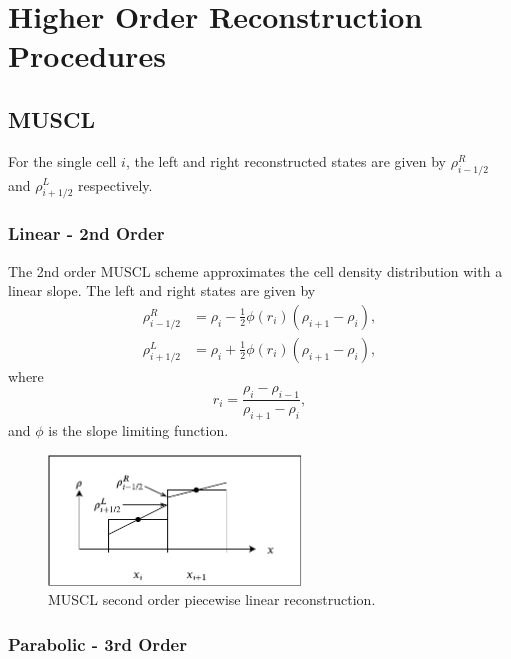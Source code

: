 \chapter{Higher Order Reconstruction Procedures}
\label{ap:reco}
\graphicspath{{image_directory/appendix/}}

\section{MUSCL}
\label{ap:MUSCLreco}

	For the single cell $i$, the left and right reconstructed states are given by $\rho^{R}_{i-1/2}$ and $\rho_{i+1/2}^{L}$ respectively. 

\subsection{Linear - 2nd Order}
	
	The 2nd order MUSCL scheme approximates the cell density distribution with a linear slope. The left and right states are given by
	\begin{align}
		\rho^{R}_{i-1/2}&=\rho_i-\frac{1}{2}\phi\left(r_i\right)\left(\rho_{i+1}-\rho_{i}\right),\\
		\rho^{L}_{i+1/2}&=\rho_i+\frac{1}{2}\phi\left(r_i\right)\left(\rho_{i+1}-\rho_{i}\right),
	\end{align}
	where 
	\begin{equation}
		r_{i}=\frac{\rho_{i}-\rho_{i-1}}{\rho_{i+1}-\rho_{i}},
	\end{equation}
	and $\phi$ is the slope limiting function.
	
	\begin{figure}
    		\centering
        		\includegraphics[trim=20 5 20 20,clip,width=0.6\textwidth]{MUSCL_linear.pdf}
		\caption[MUSCL Reconstruction : Linear $2^{nd}$ order]{MUSCL second order piecewise linear reconstruction.}
		\label{fig:app:muscl_lin}
	\end{figure}
	
\subsection{Parabolic - 3rd Order}

